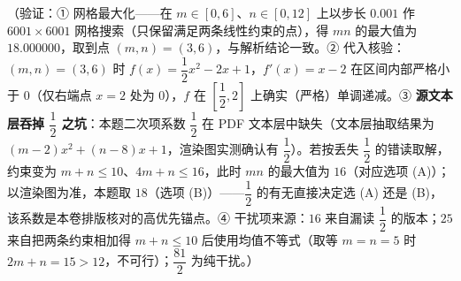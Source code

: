 \begin{answer}
（验证：① 网格最大化——在 \(m\in[0,6]\)、\(n\in[0,12]\) 上以步长 \(0.001\) 作 \(6001\times6001\) 网格搜索（只保留满足两条线性约束的点），得 \(mn\) 的最大值为 \(18.000000\)，取到点 \((m,n)=(3,6)\)，与解析结论一致。② 代入核验：\((m,n)=(3,6)\) 时 \(f(x)=\dfrac{1}{2}x^2-2x+1\)，\(f'(x)=x-2\) 在区间内部严格小于 \(0\)（仅右端点 \(x=2\) 处为 \(0\)），\(f\) 在 \(\left[\dfrac{1}{2},2\right]\) 上确实（严格）单调递减。③ \textbf{源文本层吞掉 \(\dfrac{1}{2}\) 之坑}：本题二次项系数 \(\dfrac{1}{2}\) 在 PDF 文本层中缺失（文本层抽取结果为 \((m-2)x^2+(n-8)x+1\)，渲染图实测确认有 \(\dfrac{1}{2}\)）。若按丢失 \(\dfrac{1}{2}\) 的错读取解，约束变为 \(m+n\leqslant10\)、\(4m+n\leqslant16\)，此时 \(mn\) 的最大值为 \(16\)（对应选项 (A)）；以渲染图为准，本题取 \(18\)（选项 (B)）——\(\dfrac{1}{2}\) 的有无直接决定选 (A) 还是 (B)，该系数是本卷排版核对的高优先锚点。④ 干扰项来源：\(16\) 来自漏读 \(\dfrac{1}{2}\) 的版本；\(25\) 来自把两条约束相加得 \(m+n\leqslant10\) 后使用均值不等式（取等 \(m=n=5\) 时 \(2m+n=15>12\)，不可行）；\(\dfrac{81}{2}\) 为纯干扰。）


\end{answer}
